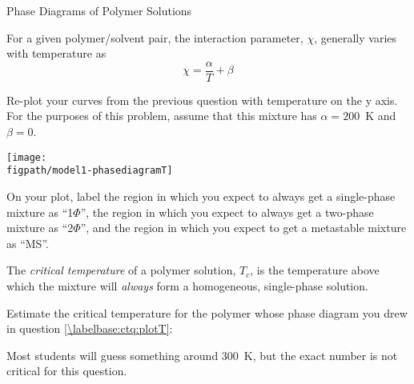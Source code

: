 \begin{activity}{Phase Diagrams of Polymer Solutions}
\begin{ctqs}
\end{ctqs}


\begin{infobox}
	For a given polymer/solvent pair, the interaction parameter, $\chi$, generally varies with temperature as
	\begin{equation*}
		\chi = \frac{\alpha}{T} + \beta
	\end{equation*}
\end{infobox}


\begin{ctqs}

	\question Re-plot your curves from the previous question with temperature on the y axis.  For the purposes of this problem, assume that this mixture has $\alpha=200$~K and $\beta=0$.
		\label{\labelbase:ctq:plotT}
	
		\centerline{\texttt{[image: \\figpath/model1-phasediagramT]}}
		
	\question On your plot, label the region in which you expect to always get a single-phase mixture as ``1$\Phi$'', the region in which you expect to always get a two-phase mixture as ``2$\Phi$'', and the region in which you expect to get a metastable mixture as ``MS''.
		
		
\end{ctqs}


\begin{infobox}

	The \emph{critical temperature} of a polymer solution, $T_c$, is the temperature above which the mixture will \emph{always} form a homogeneous, single-phase solution.

\end{infobox}


\begin{ctqs}
	\question Estimate the critical temperature for the polymer whose phase diagram you drew in question \ref{\labelbase:ctq:plotT}:
	
		\begin{solution}[0.25in]
		
			Most students will guess something around 300~K, but the exact number is not critical for this question.
		
		\end{solution}
		
\end{ctqs}



\begin{model}
	\label{\labelbase:mdl:Ndependence}


\end{model}
\end{activity}
